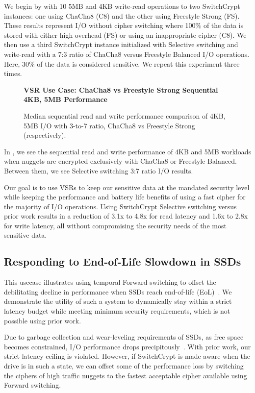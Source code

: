 We begin by with 10 5MB and 4KB write-read operations to two
SwitchCrypt instances: one using ChaCha8 (C8) and the other using Freestyle
Strong (FS). These results represent I/O without cipher switching where 100\% of
the data is stored with either high overhead (FS) or using an inappropriate
cipher (C8). We then use a third SwitchCrypt instance initialized with Selective
switching and write-read with a 7:3 ratio of ChaCha8 versus Freestyle
Balanced I/O operations. Here, 30\% of the data is considered sensitive. We
repeat this experiment three times.

\begin{figure}[ht] \textbf{VSR Use Case: ChaCha8 vs Freestyle Strong Sequential
4KB, 5MB Performance}\par\medskip
   \centering
   {} \caption{Median sequential read and write
   performance comparison of 4KB, 5MB I/O with 3-to-7 ratio, ChaCha8 vs
   Freestyle Strong (respectively).}
  \label{fig:usecase-vsr-bar}
\end{figure}

In , we see the sequential read and write performance of
4KB and 5MB workloads when nuggets are encrypted exclusively with ChaCha8 or
Freestyle Balanced. Between them, we see Selective switching 3:7 ratio I/O
results.

Our goal is to use VSRs to keep our sensitive data at the mandated security
level while keeping the performance and battery life benefits of using a fast
cipher for the majority of I/O operations. Using SwitchCrypt Selective switching
versus prior work results in a reduction of 3.1x to 4.8x for read latency and
1.6x to 2.8x for write latency, all without compromising the security needs of
the most sensitive data.

\subsection{Responding to End-of-Life Slowdown in SSDs} \label{subsec:uc3}

This usecase illustrates using temporal Forward switching to offset the
debilitating decline in performance when SSDs reach end-of-life
(EoL)~\cite{SSDEOL1}. We demonstrate the utility of such a system to dynamically
stay within a strict latency budget while meeting minimum security requirements,
which is not possible using prior work.

Due to garbage collection and wear-leveling requirements of SSDs, as free space
becomes constrained, I/O performance drops precipitously~\cite{SSDEOL1}. With
prior work, our strict latency ceiling is violated. However, if SwitchCrypt is
made aware when the drive is in such a state, we can offset some of the
performance loss by switching the ciphers of high traffic nuggets to the fastest
acceptable cipher available using Forward switching.

